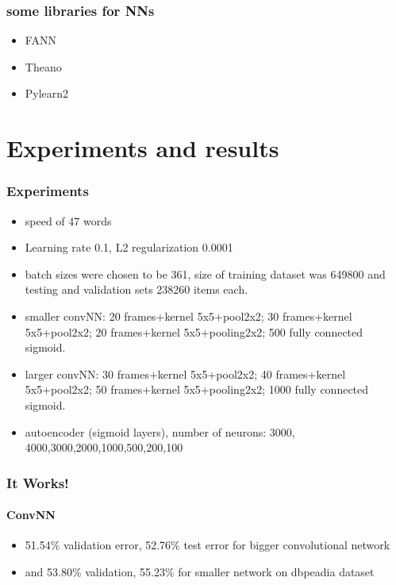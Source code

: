 \documentclass[compress,red]{beamer}
\begin{document}
%
%
%
\begin{frame}[fragile]\frametitle{some libraries for NNs}
\begin{itemize}
\item FANN
\item Theano
\item Pylearn2
\end{itemize}
\end{frame}

\section{Experiments and results}
\begin{frame}\frametitle{Experiments}

\begin{itemize}
\item speed of 47 words
\item Learning rate 0.1, L2 regularization 0.0001
\item batch sizes were chosen to be 361, size of training dataset was 649800 and testing and validation sets 238260 items each.
\item smaller convNN: 20 frames+kernel 5x5+pool2x2; 30 frames+kernel 5x5+pool2x2; 20 frames+kernel 5x5+pooling2x2; 500 fully connected sigmoid.
\item larger convNN: 30 frames+kernel 5x5+pool2x2; 40 frames+kernel 5x5+pool2x2; 50 frames+kernel 5x5+pooling2x2; 1000 fully connected sigmoid.
\item autoencoder (sigmoid layers), number of neurons: 3000, 4000,3000,2000,1000,500,200,100
\end{itemize}
\end{frame}

%
%
%
\begin{frame}\frametitle{It Works!}
\framesubtitle{ConvNN}

\begin{itemize}
\item 51.54\% validation error, 52.76\% test error for bigger convolutional network 
\item and 53.80\% validation, 55.23\% for smaller network on dbpeadia dataset 
\end{itemize}

\end{frame}
\end{document}
